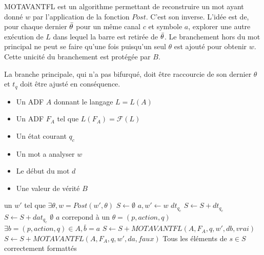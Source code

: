 MOTAVANTFL est un algorithme permettant de reconstruire un mot ayant donné $w$ par l'application de la fonction $Post$. C'est son inverse. L'idée est de, pour chaque dernier $\bar{\theta}$ pour un même canal $c$ et symbole $a$, explorer une autre exécution de $L$ dans lequel la barre est retirée de $\bar{\theta}$. Le branchement hors du mot principal ne peut se faire qu'une fois puisqu'un seul $\theta$ est ajouté pour obtenir $w$. Cette unicité du branchement est protégée par $B$.

La branche principale, qui n'a pas bifurqué, doit être raccourcie de son dernier $\theta$ et $t_q$ doit être ajusté en conséquence.



\begin{algo}[MOTAVANTFL]
    \begin{algorithmic}[1]
        \REQUIRE
        \begin{itemize}
            \item Un ADF $A$ donnant le langage $L=L(A)$
            \item Un ADF $F_A$ tel que $L(F_A)=\mathcal{F}(L)$
            \item Un état courant $q_c$
            \item Un mot a analyser $w$
            \item Le début du mot $d$
            \item Une valeur de vérité $B$ 
        \end{itemize}
        \ENSURE un $w'$ tel que $\exists \theta, w=Post(w',\theta)$
        \STATE $S\leftarrow\emptyset$
        \STATE $a,w'\leftarrow w$ 
            \RETURN $dt_{q_c}$
        \ELSE
                    \STATE $S\leftarrow S+dt_{q_c}$
                \ELSE
                    \STATE $S\leftarrow S+dat_{q_c}$
                \ENDIF
            \ELSE
                    \RETURN $\emptyset$ 
                \ELSE
                    \STATE $a$ correpond à un $\theta=(p, action, q)$
                            \STATE $\exists b=(p,action,q) \in A,\bar{b}=a$
                                \STATE $S \leftarrow S + MOTAVANTFL(A, F_A, q, w', db, vrai)$ 
                            \ENDIF
                        \ENDIF
                        \STATE $S\leftarrow S + MOTAVANTFL(A,F_A,q,w',da,faux)$
                    \ENDIF
                \ENDIF
            \ENDIF
            \RETURN Tous les éléments de $s\in S$ correctement formattés
        \ENDIF
    \end{algorithmic}
\end{algo}

